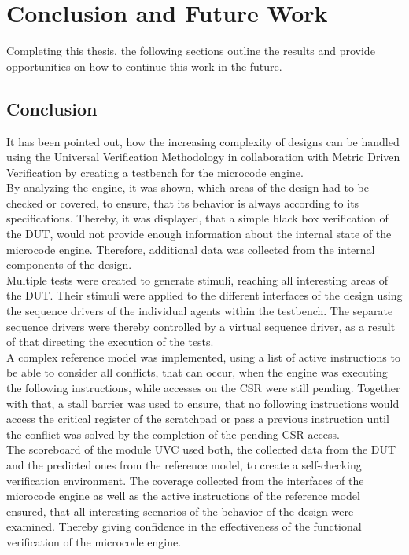 \section{Conclusion and Future Work}

Completing this thesis, the following sections outline the results and provide opportunities on how to continue this work in the future.

\subsection{Conclusion}

It has been pointed out, how the increasing complexity of designs can be handled using the Universal Verification Methodology in collaboration with Metric
Driven Verification by creating a testbench for the microcode engine.\\
By analyzing the engine, it was shown, which areas of the design had to be checked or covered, to ensure, that its behavior is always according to its
specifications.
Thereby, it was displayed, that a simple black box verification of the DUT, would not provide enough information about the internal state of the microcode
engine. Therefore, additional data was collected from the internal components of the design.\\
Multiple tests were created to generate stimuli, reaching all interesting areas of the DUT.
Their stimuli were applied to the different interfaces of the design using the sequence drivers of the individual agents within the testbench.
The separate sequence drivers were thereby controlled by a virtual sequence driver, as a result of that directing the execution of the tests.\\
A complex reference model was implemented, using a list of active instructions to be able to consider all conflicts, that can occur, when the engine was
executing the following instructions, while accesses on the CSR were still pending. Together with that, a stall barrier was used to ensure, that no following
instructions would access the critical register of the scratchpad or pass a previous instruction until the conflict was solved by the completion of the pending
CSR access. \\
The scoreboard of the module UVC used both, the collected data from the DUT and the predicted ones from the reference model, to create a
self-checking verification environment.
The coverage collected from the interfaces of the microcode engine as well as the active instructions of the reference model ensured, that all interesting
scenarios of the behavior of the design were examined. Thereby giving confidence in the effectiveness of the functional verification of the microcode engine.


